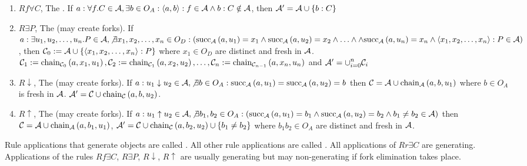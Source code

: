 \begin{defi}
\begin{enumerate}
 \item $Rf\forall C$, The . If $a:\forall f.C\in\mathcal{A},\exists b\in O_A:\left\langle a,b\right\rangle:f\in\mathcal{A}\wedge b:C\notin\mathcal{A}$, then $\mathcal{A}'=\mathcal{A}\cup\left\{ b:C\right\}$
 \item $R\exists P$, The  (may create forks). If $a:\exists u_1,u_2,\ldots,u_n.P\in\mathcal{A},\not\exists x_1,x_2,\ldots,x_n\in O_D:\left( \mbox{succ}_{\mathcal{A}}\left(a,u_1\right)=x_1\wedge\mbox{succ}_{\mathcal{A}}\left(a,u_2\right)=x_2\wedge\ldots\wedge\wedge\mbox{succ}_{\mathcal{A}}\left(a,u_n\right)=x_n\wedge\left\langle x_1,x_2,\ldots,x_n\right\rangle:P\in\mathcal{A}\right)$, then $\mathcal{C}_0:=\mathcal{A}\cup\left\{ \left\langle x_1,x_2,\ldots,x_n\right\rangle:P\right\}$ where $x_1\in O_D$ are distinct and fresh in $\mathcal{A}$. $\mathcal{C}_1:=\mbox{chain}_{\mathcal{C}_0}\left(a,x_1,u_1\right),\mathcal{C}_2:=\mbox{chain}_{\mathcal{C}_1}\left(a,x_2,u_2\right),\ldots,\mathcal{C}_n:=\mbox{chain}_{\mathcal{C}_{n-1}}\left(a,x_n,u_n\right)$ and $\mathcal{A}'=\displaystyle\cup_{i=0}^n\mathcal{C}_i$
 \item $R\downarrow$, The  (may create forks). If $a:u_1\downarrow u_2\in\mathcal{A},\not\exists b\in O_A:\mbox{succ}_{\mathcal{A}}\left(a,u_1\right)=\mbox{succ}_{\mathcal{A}}\left(a,u_2\right)=b$ then $\mathcal{C}=\mathcal{A}\cup\mbox{chain}_{\mathcal{A}}\left(a,b,u_1\right)$ where $b\in O_A$ is fresh in $\mathcal{A}$. $\mathcal{A}'=\mathcal{C}\cup\mbox{chain}_{\mathcal{C}}\left(a,b,u_2\right)$.
 \item $R\uparrow$, The  (may create forks). If $a:u_1\uparrow u_2\in\mathcal{A},\not\exists b_1,b_2\in O_A:\left( \mbox{succ}_{\mathcal{A}}\left(a,u_1\right)=b_1\wedge\mbox{succ}_{\mathcal{A}}\left(a,u_2\right)=b_2\wedge b_1\neq b_2\in\mathcal{A}\right)$ then $\mathcal{C}=\mathcal{A}\cup\mbox{chain}_{\mathcal{A}}\left(a,b_1,u_1\right)$, $\mathcal{A}'=\mathcal{C}\cup\mbox{chain}_{\mathcal{C}}\left(a,b_2,u_2\right)\cup\left\{ b_1\neq b_2\right\}$ where $b_1b_2\in O_A$ are distinct and fresh in $\mathcal{A}$.
\end{enumerate}
Rule applications that generate objects are called . All other rule applications are called . All applications of $Rr\exists C$ are generating. Applications of the rules $Rf\exists C$, $R\exists P$, $R\downarrow$, $R\uparrow$ are usually generating but may non-generating if fork elimination takes place.
\label{def:completionrulesabox}
\cite{conf/ijcai/Lutz99}
\end{defi}


